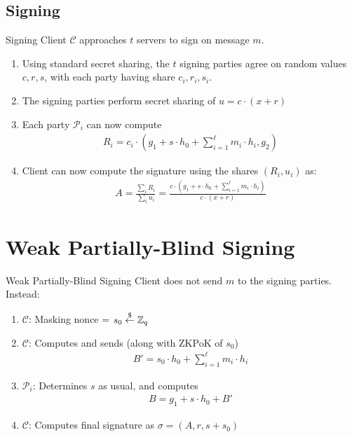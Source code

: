\documentclass[
	xcolor={svgnames},
	hyperref={pagebackref,bookmarks},
	aspectratio=43,
]{beamer}
\begin{document}
\subsection{Signing}
\begin{frame}{Signing}
	Client $\mathcal{C}$ approaches $t$ servers to sign on message $m$.
	\begin{enumerate}
		\item Using standard secret sharing, the $t$ signing parties agree on random values $c, r, s$, with each party having share $c_i, r_i, s_i$.
		\item The signing parties perform secret sharing of $u = c \cdot (x + r)$
		\item Each party $\mathcal{P}_i$ can now compute \vspace{-5mm}
		\begin{align*}
			R_i = c_i \cdot (g_1 + s \cdot h_0 + \sum_{i = 1}^{\ell} m_i \cdot h_i, g_2)
		\end{align*} \vspace{-5mm}
		\item Client can now compute the signature using the shares $(R_i, u_i)$ as:
		\begin{align*}
			A = \frac{\sum_i R_i}{\sum_i u_i} = \frac{c \cdot (g_1 + s \cdot h_0 + \sum_{i = 1}^{\ell} m_i \cdot h_i)}{c \cdot (x + r)}
		\end{align*}
	\end{enumerate}
\end{frame}

\section{Weak Partially-Blind Signing}
\begin{frame}{Weak Partially-Blind Signing}
	Client does not send $m$ to the signing parties. Instead:
	\begin{enumerate}
		\item $\mathcal{C}$: Masking nonce = $s_0 \stackrel{\$}{\leftarrow} \mathbb{Z}_q$
		\item $\mathcal{C}$: Computes and sends (along with ZKPoK of $s_0$) \vspace*{-4mm}
		\begin{align*}
			B' = s_0 \cdot h_0 + \sum_{i = 1}^{\ell} m_i \cdot h_i
		\end{align*}
		\item $\mathcal{P}_i$: Determines $s$ as usual, and computes \vspace*{-3mm}
		\begin{align*}
			B = g_1 + s \cdot h_0 + B'
		\end{align*}
		\item $\mathcal{C}$: Computes final signature as $\sigma = (A, r, s + s_0)$
	\end{enumerate}
\end{frame}
\end{document}
